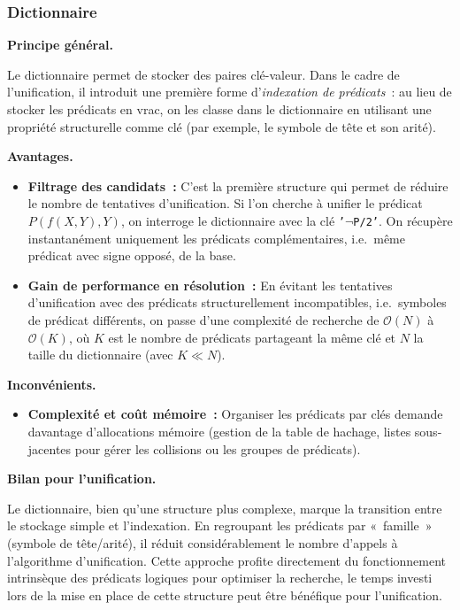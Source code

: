 \documentclass[11pt]{article}
\newenvironment{paraph}[1]{%
  \medskip
  \noindent\textbf{#1.}\quad

  \vspace{0.2cm}
}{%
  \medskip
}
\begin{document}
\subsubsection{Dictionnaire}

\begin{paraph}{Principe général}
    Le dictionnaire permet de stocker des paires clé-valeur. 
    Dans le cadre de l'unification, il introduit une première 
    forme d'\textit{indexation de prédicats}~: au lieu de stocker 
    les prédicats en vrac, on les classe dans le dictionnaire en 
    utilisant une propriété structurelle comme clé (par exemple, 
    le symbole de tête et son arité).
\end{paraph}

\begin{paraph}{Avantages}
    \begin{itemize}
        \item \textbf{Filtrage des candidats~:} C'est la première 
        structure qui permet de réduire le nombre de tentatives 
        d'unification. Si l'on cherche à unifier le prédicat $P(f(X, Y), Y)$, 
        on interroge le dictionnaire avec la clé \texttt{'$\neg$P/2'}. 
        On récupère instantanément uniquement les prédicats complémentaires,
        i.e.~même prédicat avec signe opposé, de la base. 
        \item \textbf{Gain de performance en résolution~:} En évitant 
        les tentatives d'unification avec des prédicats structurellement 
        incompatibles, i.e.~symboles de prédicat différents, on passe d'une complexité 
        de recherche de $\mathcal{O}(N)$ à $\mathcal{O}(K)$, où $K$ est le nombre de 
        prédicats partageant la même clé et $N$ la taille du dictionnaire (avec $K \ll N$).
    \end{itemize}
\end{paraph}
\newpage
\begin{paraph}{Inconvénients}
    \begin{itemize}
        \item \textbf{Complexité et coût mémoire~:} Organiser les 
        prédicats par clés demande davantage d'allocations mémoire 
        (gestion de la table de hachage, listes sous-jacentes pour 
        gérer les collisions ou les groupes de prédicats).
    \end{itemize}
\end{paraph}

\begin{paraph}{Bilan pour l'unification}
    Le dictionnaire, bien qu'une structure plus complexe, marque la 
    transition entre le stockage simple et l'indexation. En 
    regroupant les prédicats par «~famille~» (symbole de tête/arité), 
    il réduit considérablement le nombre d'appels à l'algorithme 
    d'unification. Cette approche profite directement du fonctionnement 
    intrinsèque des prédicats logiques pour optimiser la recherche, 
    le temps investi lors de la mise en place de cette structure 
    peut être bénéfique pour l'unification.
\end{paraph}
\end{document}
